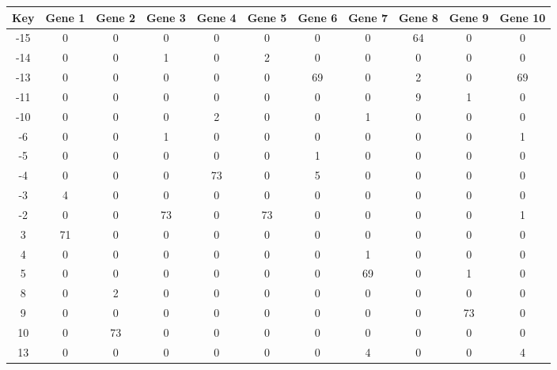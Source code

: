 \begin{tabular}{|c|c|c|c|c|c|c|c|c|c|c|}
\hline
Key & Gene 1 & Gene 2 & Gene 3 & Gene 4 & Gene 5 & Gene 6 & Gene 7 & Gene 8 & Gene 9 & Gene 10 \\
\hline
-15 & 0 & 0 & 0 & 0 & 0 & 0 & 0 & 64 & 0 & 0 \\
-14 & 0 & 0 & 1 & 0 & 2 & 0 & 0 & 0 & 0 & 0 \\
-13 & 0 & 0 & 0 & 0 & 0 & 69 & 0 & 2 & 0 & 69 \\
-11 & 0 & 0 & 0 & 0 & 0 & 0 & 0 & 9 & 1 & 0 \\
-10 & 0 & 0 & 0 & 2 & 0 & 0 & 1 & 0 & 0 & 0 \\
-6 & 0 & 0 & 1 & 0 & 0 & 0 & 0 & 0 & 0 & 1 \\
-5 & 0 & 0 & 0 & 0 & 0 & 1 & 0 & 0 & 0 & 0 \\
-4 & 0 & 0 & 0 & 73 & 0 & 5 & 0 & 0 & 0 & 0 \\
-3 & 4 & 0 & 0 & 0 & 0 & 0 & 0 & 0 & 0 & 0 \\
-2 & 0 & 0 & 73 & 0 & 73 & 0 & 0 & 0 & 0 & 1 \\
3 & 71 & 0 & 0 & 0 & 0 & 0 & 0 & 0 & 0 & 0 \\
4 & 0 & 0 & 0 & 0 & 0 & 0 & 1 & 0 & 0 & 0 \\
5 & 0 & 0 & 0 & 0 & 0 & 0 & 69 & 0 & 1 & 0 \\
8 & 0 & 2 & 0 & 0 & 0 & 0 & 0 & 0 & 0 & 0 \\
9 & 0 & 0 & 0 & 0 & 0 & 0 & 0 & 0 & 73 & 0 \\
10 & 0 & 73 & 0 & 0 & 0 & 0 & 0 & 0 & 0 & 0 \\
13 & 0 & 0 & 0 & 0 & 0 & 0 & 4 & 0 & 0 & 4 \\
\hline
\end{tabular}
